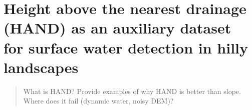 \chapter{Height above the nearest drainage (HAND) as an auxiliary dataset for surface water detection in hilly landscapes}
\label{ch6}

\begin{abstract}
What is HAND? Provide examples of why HAND is better than slope. Where does it fail (dynamic water, noisy DEM)?
\end{abstract}

\newpage
